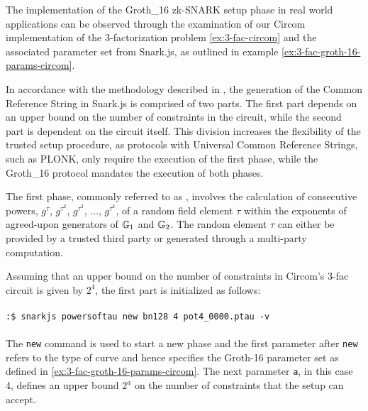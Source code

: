 \begin{example}
\label{ex:3-fac-groth-16-setup-circom} The implementation of the Groth\_16 zk-SNARK setup phase in real world applications can be observed through the examination of our Circom implementation of the $3$-factorization problem \ref{ex:3-fac-circom} and the associated parameter set from Snark.js, as outlined in example \ref{ex:3-fac-groth-16-params-circom}.

In accordance with the methodology described in \cite{bowe-17}, the generation of the Common Reference String in Snark.js is comprised of two parts. The first part depends on an upper bound on the number of constraints in the circuit, while the second part is dependent on the circuit itself. This division increases the flexibility of the trusted setup procedure, as protocols with Universal Common Reference Strings, such as PLONK, only require the execution of the first phase, while the Groth\_16 protocol mandates the execution of both phases.

The first phase, commonly referred to as , involves the calculation of consecutive powers, $g^\tau$, $g^{\tau^2}$, $g^{\tau^3}$, $\ldots$, $g^{\tau^k}$, of a random field element $\tau$ within the exponents of agreed-upon generators of $\mathbb{G}_1$ and $\mathbb{G}_2$. The random element $\tau$ can either be provided by a trusted third party or generated through a multi-party computation.

Assuming that an upper bound on the number of constraints in Circom's 3-fac circuit is given by $2^4$, the first part is initialized as follows:
\\
\\
\texttt{:\$ snarkjs powersoftau new bn128 4 pot4\_0000.ptau -v}
\\
\\
The \texttt{new} command is used to start a new phase and the first parameter after \texttt{new} refers to the type of curve and hence specifies the Groth-16 parameter set as defined in \ref{ex:3-fac-groth-16-params-circom}. The next parameter \texttt{a}, in this case 4, defines an upper bound $2^a$ on the number of constraints that the setup can accept. 


\end{example}
